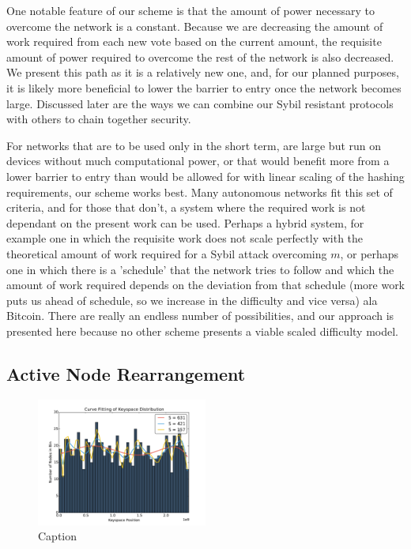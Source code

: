 \documentclass[10pt]{IEEEtran}
\begin{document}
\par One notable feature of our scheme is that the amount of power necessary to overcome the network is a constant. Because we are decreasing the amount of work required from each new vote based on the current amount, the requisite amount of power required to overcome the rest of the network is also decreased. We present this path as it is a relatively new one, and, for our planned purposes, it is likely more beneficial to lower the barrier to entry once the network becomes large. Discussed later  are the ways we can combine our Sybil resistant protocols with others to chain together security. 
\par For networks that are to be used only in the short term, are large but run on devices without much computational power, or that would benefit more from a lower barrier to entry than would be allowed for with linear scaling of the hashing requirements, our scheme works best. Many autonomous networks fit this set of criteria, and for those that don't, a system where the required work is not dependant on the present work can be used. Perhaps a hybrid system, for example one in which the requisite work does not scale perfectly with the theoretical amount of work required for a Sybil attack overcoming $m$, or perhaps one in which there is a 'schedule' that the network tries to follow and which the amount of work required depends on the deviation from that schedule (more work puts us ahead of schedule, so we increase in the difficulty and vice versa) ala Bitcoin. There are really an endless number of possibilities, and our approach is presented here because no other scheme presents a viable scaled difficulty model.


\subsection{Active Node Rearrangement}


\begin{figure}
\centering
\includegraphics[width=0.5\textwidth]{plots/histogram}
\caption{Caption}
\label{fig:my_label}
\end{figure}
\end{document}
